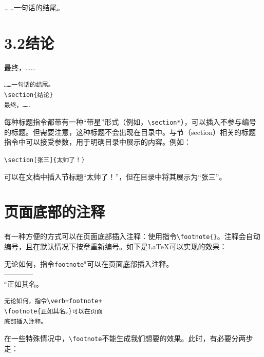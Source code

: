 \begin{codelist}[2.17]{
  ……一句话的结尾。
  \section*{3.2\quad 结论}
  最终，……
}
\begin{verbatim}
……一句话的结尾。
\section{结论}
最终，……\end{verbatim}
\end{codelist}

每种标题指令都带有一种“带星”形式（例如，\verb|\section*|），可以插入不参与编号的标题。但需要注意，这种标题不会出现在目录中。与节（section）相关的标题指令中可以接受参数，用于明确目录中展示的内容。例如：

\begin{dmd}
\verb+\section[张三]{太帅了！}+
\end{dmd}

可以在文档中插入节标题“太帅了！”，但在目录中将其展示为“张三”。

\section{页面底部的注释}

有一种方便的方式可以在页面底部插入注释：使用指令\verb|\footnote{|\verb|}|。注释会自动编号，且在默认情况下按章重新编号。如下是\LaTeX 可以实现的效果：

\begin{codelist}[2.18]{
  无论如何，指令\texttt{footnote}$^a$可以在页面底部插入注释。\\
  ————\\%
  {\footnotesize $^a$正如其名。}
}
\begin{verbatim}
无论如何，指令\verb+footnote+
\footnote{正如其名。}可以在页面
底部插入注释。\end{verbatim}
\end{codelist}

在一些特殊情况中，\verb|\footnote|不能生成我们想要的效果。此时，有必要分两步走：

